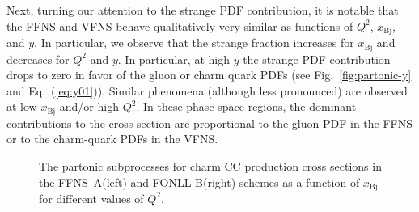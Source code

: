 \documentclass[pdftex,twocolumn,epjc3]{svjour3}          %
\newcommand{\xbj}{\ensuremath{x_{\text{Bj}}}\xspace}
\newcommand{\fonll} {{FONLL-B}\xspace}
\newcommand{\ffns} {{FFNS~A}\xspace}
\begin{document}

Next, turning our attention to the strange PDF contribution, it is
notable that the FFNS and VFNS behave qualitatively very similar as
functions of $Q^2$, \xbj, and $y$. In particular, we observe that the
strange fraction increases for \xbj and decreases for $Q^2$ and $y$.
%
In particular, at high $y$ the strange PDF contribution drops to zero
in favor of the gluon or charm quark PDFs (see
Fig.~\ref{fig:partonic-y} and Eq.~(\ref{eq:y01})). Similar phenomena
(although less pronounced) are observed at low \xbj and/or high
$Q^2$. In these phase-space regions, the dominant contributions to the
cross section are proportional to the gluon PDF in the FFNS or to the
charm-quark PDFs in the VFNS.

\begin{figure}
  \centering
  \caption{The partonic subprocesses for charm CC production cross
    sections in the \ffns (left) and \fonll (right) schemes as a
    function of \xbj for different values of $Q^2$.}
  \label{fig:partonic-x}
\end{figure}
\end{document}
